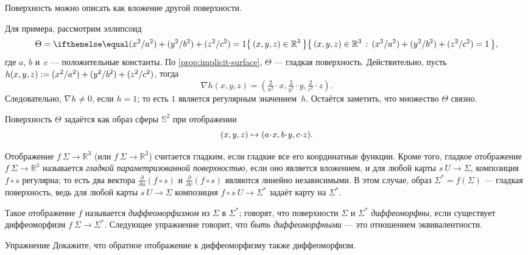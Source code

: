 Поверхность можно описать как вложение другой поверхности.

Для примера, рассмотрим эллипсоид
\[\Theta=\set{(x,y,z)\in\mathbb{R}^3}{\tfrac{x^2}{a^2}+\tfrac{y^2}{b^2}+\tfrac{z^2}{c^2}=1},\]
где $a$, $b$ и~$c$ --- положительные константы.
По \ref{prop:implicit-surface}, $\Theta$ --- гладкая поверхность.
Действительно, пусть $h(x,y,z)\mathrel{:=}(x^2/a^2)+(y^2/b^2)+(z^2/c^2)$,
тогда
\[\nabla h(x,y,z)=(\tfrac{2}{a^2}\cdot x,\tfrac{2}{b^2}\cdot y,\tfrac{2}{c^2}\cdot z).\]
Следовательно, $\nabla h\ne0$, если $h=1$; то есть $1$ является регулярным значением~$h$.
Остаётся заметить, что множество $\Theta$ связно.

Поверхность $\Theta$ задаётся как образ сферы $\mathbb{S}^2$ при отображении
\[(x,y,z)\z\mapsto (a\cdot x, b\cdot y,c\cdot z).\]

Отображение $f\:\Sigma \to \mathbb{R}^3$ (или $f\:\Sigma \to \mathbb{R}^2$) считается гладким, если гладкие все его координатные функции.
Кроме того, гладкое отображение $f \: \Sigma \to \mathbb{R}^3$ называется 
\emph{гладкой параметризованной поверхностью}, если оно является вложением, и для любой карты $s \:U\to \Sigma$,
композиция $f\circ s$ регулярна;
то есть два вектора 
$\frac{\partial}{\partial u}(f\circ s)$ и $\frac{\partial}{\partial v}(f\circ s)$ являются линейно независимыми.
В этом случае, образ $\Sigma^{*}=f(\Sigma)$ --- гладкая поверхность, ведь для любой карты $s\:U\to \Sigma$ композиция $f\circ s\:U\to \Sigma^{*}$ задаёт карту на $\Sigma^{*}$. 

Такое отображение $f$ называется \emph{диффеоморфизмом} из $\Sigma$ в $\Sigma^{*}$;
говорят, что поверхности $\Sigma$ и $\Sigma^{*}$ {}\emph{диффеоморфны}, если существует диффеоморфизм $f\:\Sigma\to\Sigma^{*}$.
Следующее упражнение говорит, что \textit{быть диффеоморфными} --- это отношением эквивалентности.

\begin{thm}{Упражнение}\label{ex:inv-diffeomorphism}
Докажите, что обратное отображение к диффеоморфизму также диффеоморфизм.
\end{thm}

